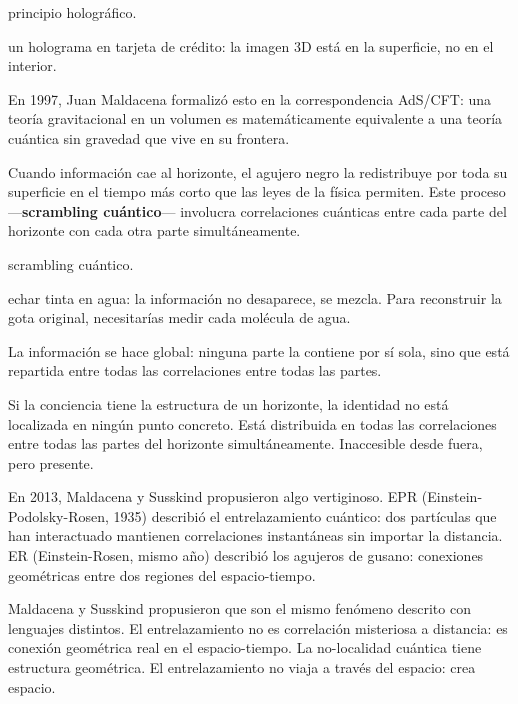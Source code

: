 \begin{fisica}
 principio holográfico.

 un holograma en tarjeta de crédito: la imagen 3D está en la superficie, no en el interior.
\end{fisica}
En 1997, Juan Maldacena formalizó esto en la correspondencia AdS/CFT: una teoría gravitacional en un volumen es matemáticamente equivalente a una teoría cuántica sin gravedad que vive en su frontera.

\noindent Cuando información cae al horizonte, el agujero negro la redistribuye por toda su superficie en el tiempo más corto que las leyes de la física permiten. Este proceso —\textbf{scrambling cuántico}— involucra correlaciones cuánticas entre cada parte del horizonte con cada otra parte simultáneamente.

\begin{fisica}
 scrambling cuántico.

 echar tinta en agua: la información no desaparece, se mezcla. Para reconstruir la gota original, necesitarías medir cada molécula de agua.
\end{fisica}
La información se hace global: ninguna parte la contiene por sí sola, sino que está repartida entre todas las correlaciones entre todas las partes.

Si la conciencia tiene la estructura de un horizonte, la identidad no está localizada en ningún punto concreto. Está distribuida en todas las correlaciones entre todas las partes del horizonte simultáneamente. Inaccesible desde fuera, pero presente.

\noindent En 2013, Maldacena y Susskind propusieron algo vertiginoso. EPR (Einstein-Podolsky-Rosen, 1935) describió el entrelazamiento cuántico: dos partículas que han interactuado mantienen correlaciones instantáneas sin importar la distancia. ER (Einstein-Rosen, mismo año) describió los agujeros de gusano: conexiones geométricas entre dos regiones del espacio-tiempo.

Maldacena y Susskind propusieron que son el mismo fenómeno descrito con lenguajes distintos. El entrelazamiento no es correlación misteriosa a distancia: es conexión geométrica real en el espacio-tiempo. La no-localidad cuántica tiene estructura geométrica. El entrelazamiento no viaja a través del espacio: crea espacio.

